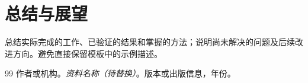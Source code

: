 \documentclass[UTF8,a4paper,12pt,fontset=fandol]{ctexart}
\begin{document}
\section{总结与展望}
总结实际完成的工作、已验证的结果和掌握的方法；说明尚未解决的问题及后续改进方向。避免直接保留模板中的示例描述。

\clearpage
{}
{}
\begin{thebibliography}{99}
    作者或机构。\emph{资料名称（待替换）}。版本或出版信息，年份。
\end{thebibliography}

\end{document}
